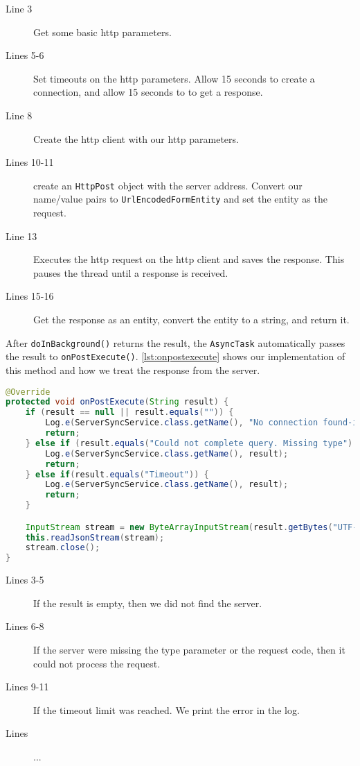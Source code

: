 \begin{description}
\item[Line 3] Get some basic http parameters.
\item[Lines 5-6] Set timeouts on the http parameters. Allow 15 seconds to create a connection, and allow 15 seconds to to get a response.
\item[Line 8] Create the http client with our http parameters.
\item[Lines 10-11]create an \lstinline|HttpPost| object with the server address. Convert our name/value pairs to \lstinline|UrlEncodedFormEntity| and set the entity as the request.
\item[Line 13] Executes the http request on the http client and saves the response. This pauses the thread until a response is received.
\item[Lines 15-16] Get the response as an entity, convert the entity to a string, and return it.
\end{description}
After \lstinline|doInBackground()| returns the result, the \lstinline|AsyncTask| automatically passes the result to \lstinline|onPostExecute()|. \autoref{lst:onpostexecute} shows our implementation of this method and how we treat the response from the server.

\begin{lstlisting}[language=java, label=lst:onpostexecute, caption={The async method \lstinline|onPostExecute()|}]
@Override
protected void onPostExecute(String result) {
    if (result == null || result.equals("")) {
        Log.e(ServerSyncService.class.getName(), "No connection found-ish.");
        return;
    } else if (result.equals("Could not complete query. Missing type") || result.equals("Missing request code!")) {
        Log.e(ServerSyncService.class.getName(), result);
        return;
    } else if(result.equals("Timeout")) {
        Log.e(ServerSyncService.class.getName(), result);
        return;
    }

    InputStream stream = new ByteArrayInputStream(result.getBytes("UTF-8"));
    this.readJsonStream(stream);
    stream.close();
}
\end{lstlisting}

\begin{description}
\item[Lines 3-5] If the result is empty, then we did not find the server.
\item[Lines 6-8] If the server were missing the type parameter or the request code, then it could not process the request.
\item[Lines 9-11] If the timeout limit was reached. We print the error in the log. 
\item[Lines ] ... 
\end{description}